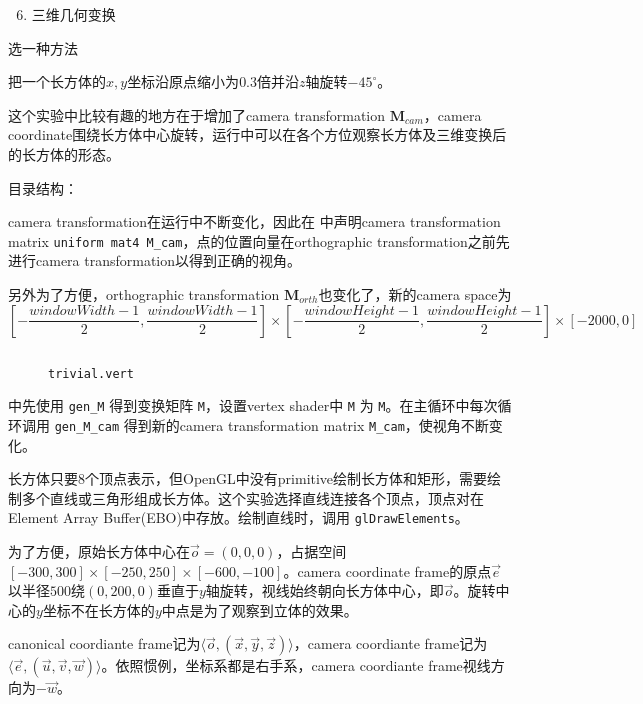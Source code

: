 \documentclass{cumtbrep}
\newcommand\inputcode[3][c++]{%
	\inputminted{#1}{#2}
	\begin{figure}[H]
		\centering
		\captionsetup{type=table}
		\caption{\texttt{#3}}
	\end{figure}
}
\newcommand\inline[2][c++]{\texttt{#2}}
\begin{document}

\namesec
\begin{enumerate}
	\setcounter{enumi}{5}
	\item 三维几何变换
\end{enumerate}

\purposesec
\noindent 选一种方法

\contentsec
把一个长方体的$x,y$坐标沿原点缩小为$0.3$倍并沿$z$轴旋转$-45^\circ$。

这个实验中比较有趣的地方在于增加了camera transformation $\mathbf{M}_{\mathit{cam}}$，camera coordinate围绕长方体中心旋转，运行中可以在各个方位观察长方体及三维变换后的长方体的形态。

目录结构：{\ttfamily }

camera transformation在运行中不断变化，因此在  中声明camera transformation matrix \inline[glsl]{uniform mat4 M_cam}，点的位置向量在orthographic transformation之前先进行camera transformation以得到正确的视角。

另外为了方便，orthographic transformation $\mathbf{M}_{\mathit{orth}}$也变化了，新的camera space为
\[
	\left[- \frac{\mathit{windowWidth} - 1}{2},\frac{\mathit{windowWidth} - 1}{2}\right]\times\left[- \frac{\mathit{windowHeight} - 1}{2},\frac{\mathit{windowHeight} - 1}{2}\right]\times\left[-2000,0\right]
\]

\inputcode[glsl]{../trans3d/trivial.vert}{trivial.vert}

中先使用 \inline{gen_M} 得到变换矩阵 \inline{M}，设置vertex shader中 \inline[glsl]{M} 为 \inline{M}。在主循环中每次循环调用 \inline{gen_M_cam} 得到新的camera transformation matrix \inline{M_cam}，使视角不断变化。

长方体只要8个顶点表示，但OpenGL中没有primitive绘制长方体和矩形，需要绘制多个直线或三角形组成长方体。这个实验选择直线连接各个顶点，顶点对在Element Array Buffer(EBO)中存放。绘制直线时，调用 \inline{glDrawElements}。

为了方便，原始长方体中心在$\vec{o}=(0,0,0)$，占据空间$[-300,300]\times[-250,250]\times[-600,-100]$。camera coordinate frame的原点$\vec{e}$以半径$500$绕$(0,200,0)$垂直于$y$轴旋转，视线始终朝向长方体中心，即$\vec{o}$。旋转中心的$y$坐标不在长方体的$y$中点是为了观察到立体的效果。

canonical coordiante frame记为$\langle\vec{o},(\vec{x},\vec{y},\vec{z})\rangle$，camera coordiante frame记为$\langle\vec{e},(\vec{u},\vec{v},\vec{w})\rangle$。依照惯例，坐标系都是右手系，camera coordiante frame视线方向为$-\vec{w}$。
\end{document}
